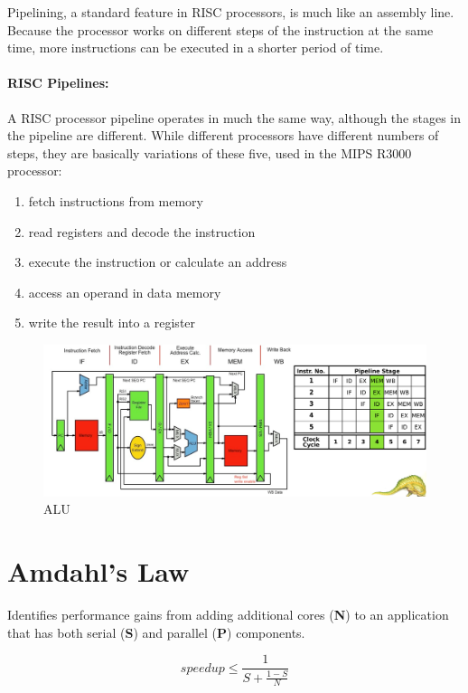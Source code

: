 \newpage
Pipelining, a standard feature in RISC processors, is much like an assembly line. Because the processor works on different steps of the instruction at the same time, more instructions can be executed in a shorter period of time.


\paragraph{RISC Pipelines:} A RISC processor pipeline operates in much the same way, although the stages in the pipeline are different. While different processors have different numbers of steps, they are basically variations of these five, used in the MIPS R3000 processor:

\begin{enumerate}
    \item fetch instructions from memory
    \item read registers and decode the instruction
    \item execute the instruction or calculate an address
    \item access an operand in data memory
    \item write the result into a register
\end{enumerate}

\begin{figure}[htbp]
    \centering
    \includegraphics[width=0.8\linewidth]{img/ALU.png}    
    \caption{ALU}
\end{figure}


\newpage
\section{Amdahl’s Law}

Identifies performance gains from adding additional cores (\textbf{N}) to an application that has both serial (\textbf{S}) and parallel (\textbf{P}) components.

\begin{equation*}
    \textit{speedup} \leq \frac{1}{S+\frac{1-S}{N}}
\end{equation*}

